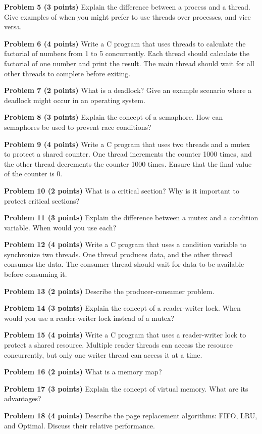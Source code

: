 \documentclass{article}
\begin{document}
\textbf{Problem 5 (3 points)} Explain the difference between a process and a thread.  Give examples of when you might prefer to use threads over processes, and vice versa.


\textbf{Problem 6 (4 points)} Write a C program that uses threads to calculate the factorial of numbers from 1 to 5 concurrently. Each thread should calculate the factorial of one number and print the result. The main thread should wait for all other threads to complete before exiting.


\textbf{Problem 7 (2 points)} What is a deadlock? Give an example scenario where a deadlock might occur in an operating system.


\textbf{Problem 8 (3 points)} Explain the concept of a semaphore.  How can semaphores be used to prevent race conditions?


\textbf{Problem 9 (4 points)} Write a C program that uses two threads and a mutex to protect a shared counter. One thread increments the counter 1000 times, and the other thread decrements the counter 1000 times.  Ensure that the final value of the counter is 0.


\textbf{Problem 10 (2 points)} What is a critical section? Why is it important to protect critical sections?


\textbf{Problem 11 (3 points)}  Explain the difference between a mutex and a condition variable. When would you use each?


\textbf{Problem 12 (4 points)} Write a C program that uses a condition variable to synchronize two threads. One thread produces data, and the other thread consumes the data. The consumer thread should wait for data to be available before consuming it.


\textbf{Problem 13 (2 points)} Describe the producer-consumer problem.


\textbf{Problem 14 (3 points)}  Explain the concept of a reader-writer lock. When would you use a reader-writer lock instead of a mutex?


\textbf{Problem 15 (4 points)} Write a C program that uses a reader-writer lock to protect a shared resource. Multiple reader threads can access the resource concurrently, but only one writer thread can access it at a time.


\textbf{Problem 16 (2 points)} What is a memory map?


\textbf{Problem 17 (3 points)} Explain the concept of virtual memory. What are its advantages?


\textbf{Problem 18 (4 points)}  Describe the page replacement algorithms: FIFO, LRU, and Optimal.  Discuss their relative performance.
\end{document}

